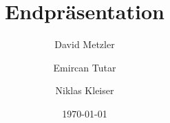 \documentclass[]{beamer}
\title[]{Endpräsentation}
\author[shortname]{David Metzler \and Emircan Tutar  \and Niklas Kleiser}
\institute[shortinst]{ Hochschule Ravensburg Weingraten\\ \smallskip}
\date{ \today}
\begin{document}

\begin{frame}
	\titlepage %
\end{frame}





\end{document}
